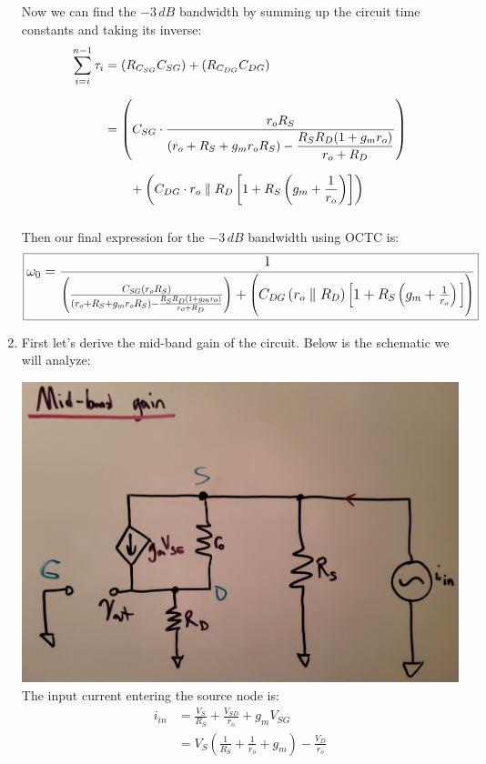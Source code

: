 \documentclass[12pt, fleqn]{article}
\begin{document}
\begin{enumerate}[label=(\alph*)]
    Now we can find the $-3\,dB$ bandwidth by summing up the circuit time constants and taking its inverse:
    \begin{align*}
        \sum_{i=i}^{n - 1} \tau_i &= (R_{C_{SG}} C_{SG}) + (R_{C_{DG}} C_{DG})\\[0.25cm]
        &= \left(C_{SG} \cdot \frac{r_o R_S}{(r_o + R_S + g_m r_o R_S) - \mathlarger{\frac{R_S R_D(1 + g_m r_o)}{r_o + R_D}}}\right)\\[0.25cm]
        &\qquad + \left(C_{DG}\cdot r_o \parallel R_D \left[1 +  R_S\left(g_m + \frac{1}{r_o}\right)\right]\right)\\[0.25cm]
    \end{align*}
    
    Then our final expression for the $-3\,dB$ bandwidth using OCTC is:
    \begin{equation*}
        \boxed{\mathlarger{\mathlarger{\omega_0 = \frac{1}{\left(\frac{C_{SG}(r_o R_S)}{(r_o + R_S + g_m r_o R_S) - \frac{R_S R_D(1 + g_m r_o)}{r_o + R_D}}\right) + \Bigg(C_{DG} \left(r_o \parallel R_D\right) \Big[1 +  R_S\left(g_m + \frac{1}{r_o}\right)\Big]\Bigg)}}}}
    \end{equation*}
\newpage

    \item
    {
    First let's derive the mid-band gain of the circuit.  Below is the schematic we will analyze:
    
    \includegraphics[scale=0.12, center]{p3mbg.jpg}\\
    
    The input current entering the source node is: 
    \begin{align}
        i_{in} &= \frac{V_S}{R_S} + \frac{V_{SD}}{r_o} + g_m V_{SG}\\[0.25cm]
        &= V_S\left(\frac{1}{R_S} + \frac{1}{r_o} + g_m\right) - \frac{V_D}{r_o}
        \label{eq:mbg1}
    \end{align}

}
\end{enumerate}
\end{document}

